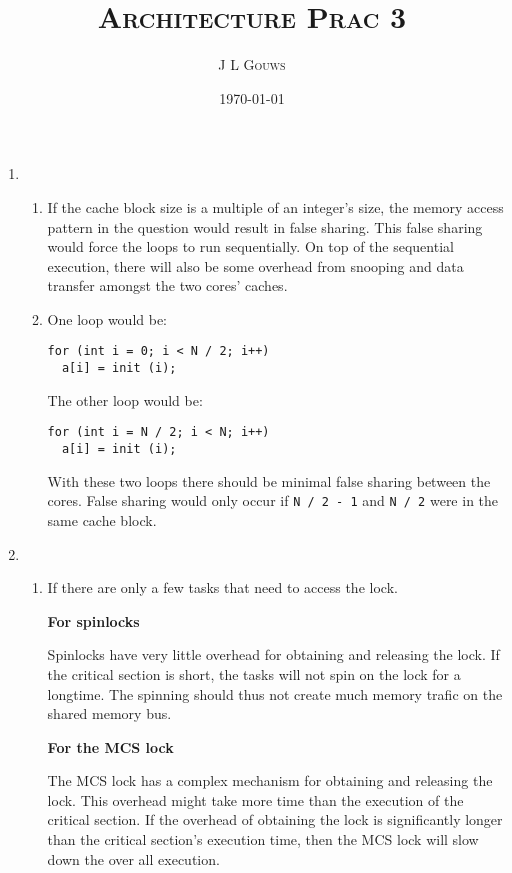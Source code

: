 \documentclass[12pt,a4]{article}
\title{
\textsc{Architecture Prac 3}
}
\author{\textsc{J L Gouws}
}
\date{\today
\\[1cm]}
\begin{document}
\thispagestyle{empty}

\maketitle

\begin{enumerate}
  \item
    \begin{enumerate}
      \item
        If the cache block size is a multiple of an integer's size, the memory access pattern in the question would result in false sharing.
        This false sharing would force the loops to run sequentially.
        On top of the sequential execution, there will also be some overhead from snooping and data transfer amongst the two cores' caches.
      \item
        One loop would be:
        \begin{Verbatim}
for (int i = 0; i < N / 2; i++)
  a[i] = init (i);
        \end{Verbatim}
        The other loop would be:
        \begin{Verbatim}
for (int i = N / 2; i < N; i++)
  a[i] = init (i);
        \end{Verbatim}
        With these two loops there should be minimal false sharing between the cores.
        False sharing would only occur if \verb|N / 2 - 1| and \verb|N / 2| were in the same cache block.
    \end{enumerate}
  \item
    \begin{enumerate}
      \item
        If there are only a few tasks that need to access the lock.

        {\textbf {For spinlocks}}

          Spinlocks have very little overhead for obtaining and releasing the lock.
          If the critical section is short, the tasks will not spin on the lock for a longtime.
          The spinning should thus not create much memory trafic on the shared memory bus.

        {\textbf {For the MCS lock}}

          The MCS lock has a complex mechanism for obtaining and releasing the lock.
          This overhead might take more time than the execution of the critical section.
          If the overhead of obtaining the lock is significantly longer than the critical section's execution time, then the MCS lock will slow down the over all execution.


\end{enumerate}
\end{enumerate}
\end{document}

